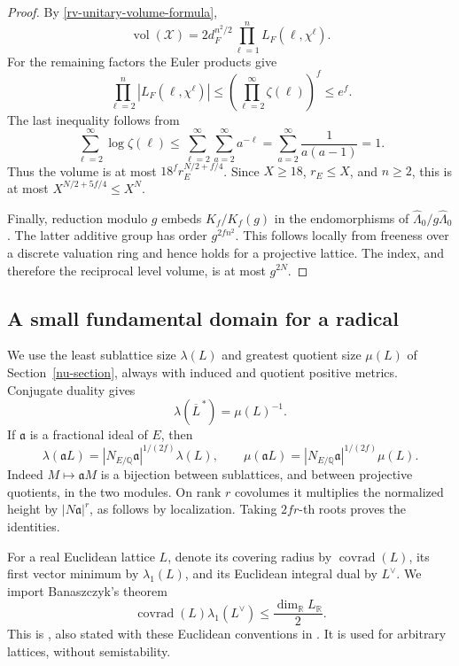 \begin{proof}
By \eqref{rv-unitary-volume-formula},
\[
 \operatorname{vol}(\mathcal X)
     =2d_F^{n^2/2}\prod_{\ell=1}^n L_F(\ell,\chi^\ell).
\]
For the remaining factors the Euler products give
\[
 \prod_{\ell=2}^n |L_F(\ell,\chi^\ell)|
 \le\left(\prod_{\ell=2}^{\infty}\zeta(\ell)\right)^f
 \le e^f.
\]
The last inequality follows from
\[
 \sum_{\ell=2}^{\infty}\log\zeta(\ell)
 \le\sum_{\ell=2}^{\infty}\sum_{a=2}^{\infty}a^{-\ell}
 =\sum_{a=2}^{\infty}\frac1{a(a-1)}=1.
\]
Thus the volume is at most
\(18^f r_E^{N/2+f/4}\).
Since \(X\ge18\), \(r_E\le X\), and \(n\ge2\), this is
at most \(X^{N/2+5f/4}\le X^N\).

Finally, reduction modulo \(g\) embeds \(K_f/K_f(g)\)
in the endomorphisms of
\(\widehat\Lambda_0/g\widehat\Lambda_0\).
The latter additive group has order \(g^{2fn^2}\).
This follows locally from freeness over a discrete
valuation ring and hence holds for a projective lattice.
The index, and therefore the reciprocal level volume,
is at most \(g^{2N}\).
\end{proof}

\subsection{A small fundamental domain for a radical}

We use the least sublattice size \(\lambda(L)\) and
greatest quotient size \(\mu(L)\) of
Section~\ref{nu-section}, always with induced and quotient
positive metrics.  Conjugate duality gives
\[
            \lambda(\overline L^{\,*})=\mu(L)^{-1}.
\]
If \(\mathfrak a\) is a fractional ideal of \(E\), then
\begin{equation}\label{dc-ideal-size}
 \lambda(\mathfrak a L)
     =|N_{E/\mathbb Q}\mathfrak a|^{1/(2f)}\lambda(L),
 \qquad
 \mu(\mathfrak a L)
     =|N_{E/\mathbb Q}\mathfrak a|^{1/(2f)}\mu(L).
\end{equation}
Indeed \(M\mapsto\mathfrak aM\) is a bijection between
sublattices, and between projective quotients, in the
two modules.  On rank \(r\) covolumes it multiplies
the normalized height by
\(|N\mathfrak a|^r\), as follows by localization.
Taking \(2fr\)-th roots proves the identities.

For a real Euclidean lattice \(L\), denote its covering
radius by \(\operatorname{covrad}(L)\), its first vector
minimum by \(\lambda_1(L)\), and its Euclidean integral
dual by \(L^\vee\).  We import Banaszczyk's theorem
\begin{equation}\label{dc-transference}
       \operatorname{covrad}(L)\lambda_1(L^\vee)
                         \le\frac{\dim_{\mathbb R}L_{\mathbb R}}2.
\end{equation}
This is \cite[Theorem~2.2]{banaszczyk-transference},
also stated with these Euclidean conventions in
\cite[Theorem~3.7.2, (3.54)]{bost-kunnemann-extensions}.
It is used for arbitrary lattices, without semistability.

